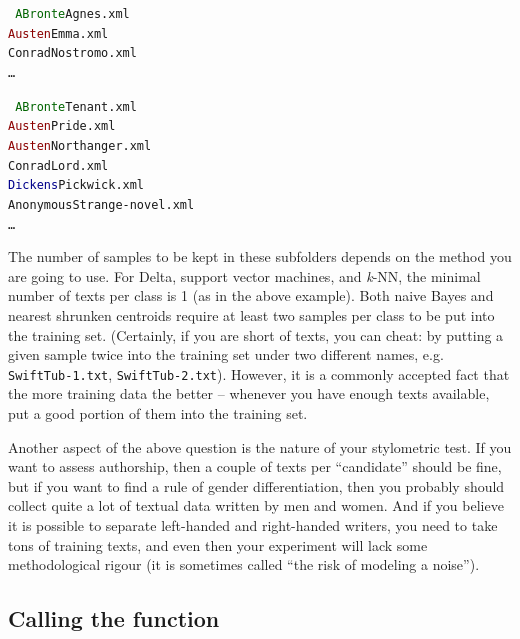 \documentclass[11pt,a4paper]{article}
\def\underscore{\raisebox{-.8ex}{-}}
\def\code#1{{\tt #1}}
\begin{document}
\medskip

\code{
\noindent
\textcolor{darkgreen}{ABronte}\underscore Agnes.xml \\
\textcolor{darkred}{Austen}\underscore Emma.xml \\
\textcolor{myyellow}{Conrad}\underscore Nostromo.xml \\
\dots
}

\medskip

\code{
\noindent
\textcolor{darkgreen}{ABronte}\underscore Tenant.xml \\
\textcolor{darkred}{Austen}\underscore Pride.xml \\
\textcolor{darkred}{Austen}\underscore Northanger.xml \\
\textcolor{myyellow}{Conrad}\underscore Lord.xml \\
\textcolor{darkblue}{Dickens}\underscore Pickwick.xml \\
\textcolor[rgb]{0.3,0.3,0.3}{Anonymous}\underscore Strange-novel.xml \\
\dots
}

\medskip


The number of samples to be kept in these subfolders depends on the
method you are going to use. For Delta, support vector machines, and
\textit{k}-NN, the minimal number of texts per class is 1 (as in the above
example). Both naive Bayes and nearest shrunken centroids require
at least two samples per class to be put into the training set. (Certainly,
if you are short of texts, you can cheat: by putting a given sample
twice into the training set under two different names, e.g. \code{Swift\underscore{}Tub-1.txt},
\code{Swift\underscore{}Tub-2.txt}). However, it is a commonly
accepted fact that the more training data the better -- whenever you
have enough texts available, put a good portion of them into the training
set.

Another aspect of the above question is the nature of your stylometric
test. If you want to assess authorship, then a couple of texts per
``candidate'' should be fine, but if you want to find a rule of gender
differentiation, then you probably should collect quite a lot of textual
data written by men and women. And if you believe it is possible to
separate left-handed and right-handed writers, you need to take tons
of training texts, and even then your experiment will lack some methodological
rigour (it is sometimes called ``the risk of modeling a noise'').


\subsection{Calling the function}
\end{document}

